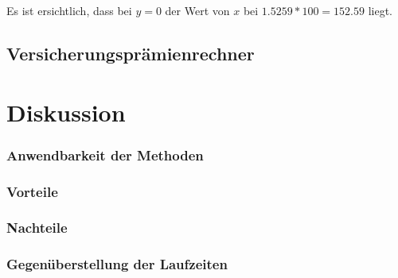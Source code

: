 \documentclass[10pt]{article}         %
\begin{document}
Es ist ersichtlich, dass bei $y=0$ der Wert von $x$ bei $1.5259*100=152.59$ liegt.


\subsection{Versicherungsprämienrechner}

\section{Diskussion}
\subsubsection{Anwendbarkeit der Methoden}
\subsubsection{Vorteile}
\subsubsection{Nachteile}
\subsubsection{Gegenüberstellung der Laufzeiten}
\end{document}
